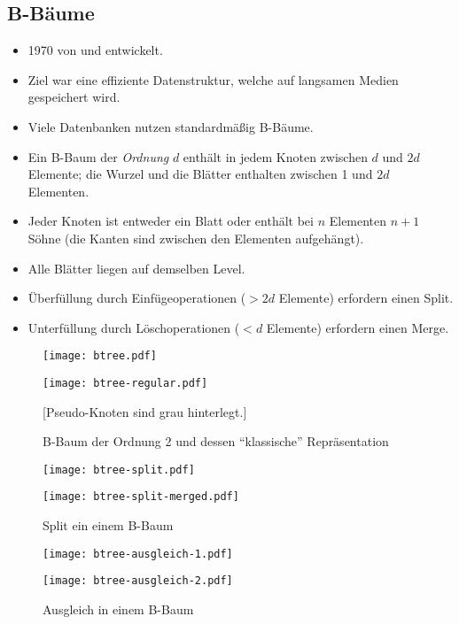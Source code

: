 \subsection{B-Bäume}
\begin{itemize}
  \item 1970 von  und  entwickelt.
  \item Ziel war eine effiziente Datenstruktur, welche auf langsamen Medien gespeichert wird.
  \item Viele Datenbanken nutzen standardmäßig B-Bäume.
  \item Ein B-Baum der \emph{Ordnung} $d$ enthält in jedem Knoten zwischen $d$ und $2d$ Elemente; die Wurzel und die Blätter enthalten zwischen 1 und $2d$ Elementen.
  \item Jeder Knoten ist entweder ein Blatt oder enthält bei $n$ Elementen $n+1$ Söhne (die Kanten sind zwischen den Elementen aufgehängt).
  \item Alle Blätter liegen auf demselben Level.
  \item Überfüllung durch Einfügeoperationen ($>2d$ Elemente) erfordern einen Split.
  \item Unterfüllung durch Löschoperationen ($<d$ Elemente) erfordern einen Merge.
\end{itemize}

\begin{figure}[htb]
\centering
\noindent\texttt{[image: btree.pdf]}

\medskip
\noindent\texttt{[image: btree-regular.pdf]}

{\small[Pseudo-Knoten sind grau hinterlegt.]}

\caption{B-Baum der Ordnung 2 und dessen \enquote{klassische} Repräsentation}
\end{figure}

\begin{figure}[htb]
\centering\texttt{[image: btree-split.pdf]}

\bigskip\texttt{[image: btree-split-merged.pdf]}

\caption{Split ein einem B-Baum}
\end{figure}

\begin{figure}[htb]
\centering\texttt{[image: btree-ausgleich-1.pdf]}

\bigskip\texttt{[image: btree-ausgleich-2.pdf]}

\caption{Ausgleich in einem B-Baum}
\end{figure}

